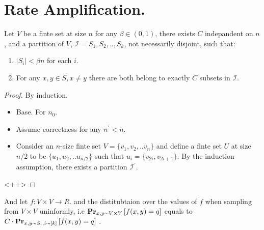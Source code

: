 \documentclass[manuscript,screen,review]{acmart}
\begin{document}
\section{Rate Amplification.}


\begin{claim}
  Let $V$ be a finte set at size $n$ for any $\beta \in (0,1)$, there exists $C$ indepandent on $n$, and a partition of $V$, $\mathcal{I} = S_{1},S_{2},..,S_{k}$, not necessarily disjoint, such that: 
  \begin{enumerate}
    \item $|S_{i}| < \beta n$ for each $i$.
    \item For any $x,y \in S, x\neq y$ there are both belong to exactly $C$ subsets in $\mathcal{I}$.
  \end{enumerate}
\end{claim}

\begin{proof}
  By induction.
  \begin{itemize}
      \item Base. For $n_{0}$. 
      \item Assume correctness for any $n^{\prime} < n$. 
      \item Consider an $n$-size finte set $V = \{ v_1, v_2 ,.. v_n\}$ and define a finte set $U$ at size $n/2$ to be $\{u_1, u_2, .. u_{n/2}\}$ such that $u_{i} = \{v_{2i}, v_{2i+1}\}$. By the induction assumption, there exists a partition $\mathcal{I}^{\prime}$. 
  \end{itemize}<++>
\end{proof}

\begin{corollary}
And let $ f : V \times V \rightarrow R$. and the distitubtaion over the values of $f$ when sampling from $V \times V$ uninformly, i.e $\prbm{ f(x,y) = q  }{x,y \sim V \times V}$  equals to $C \cdot \prbm{f(x,y) = q }{x,y \sim S_{i}, i\sim [k]}$ .
\end{corollary}


%
%
%
\end{document}
